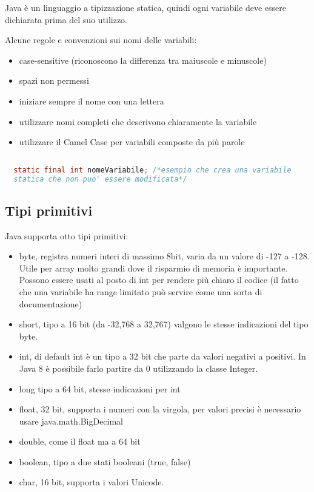 \documentclass[a4paper,12pt,twoside]{book}
\begin{document}
\vspace{1em}

Java è un linguaggio a tipizzazione statica, quindi ogni variabile
deve essere dichiarata prima del suo utilizzo.

Alcune regole e convenzioni sui nomi delle variabili:
\begin{itemize}
\item case-sensitive (riconoscono la differenza
  tra maiuscole e minuscole)
\item spazi non permessi
\item iniziare sempre il nome con una lettera
\item utilizzare nomi completi che descrivono
  chiaramente la variabile
\item utilizzare il Camel Case per variabili composte da più parole
\end{itemize}

\begin{lstlisting}[caption={Dichiarazione variabili},
  label={lst:Declaration},language=Java]
  
  static final int nomeVariabile; /*esempio che crea una variabile
  statica che non puo' essere modificata*/

\end{lstlisting}

\subsection{Tipi primitivi}

Java supporta otto tipi primitivi:
\begin{itemize}
\item byte, registra numeri interi di massimo 8bit, varia da un valore
  di -127 a -128. Utile per array molto grandi dove il risparmio di
  memoria è importante. Possono essere usati al posto di int per
  rendere più chiaro il codice (il fatto che una variabile ha range
  limitato può servire come una sorta di documentazione)
\item short, tipo a 16 bit (da -32,768 a 32,767) valgono le stesse
  indicazioni del tipo byte.
\item int, di default int è un tipo a 32 bit che parte da valori
  negativi a positivi. In Java 8 è possibile farlo partire da 0
  utilizzando la classe Integer.
\item long tipo a 64 bit, stesse indicazioni per int
\item float, 32 bit, supporta i numeri con la virgola, per valori
  precisi è necessario usare java.math.BigDecimal
\item  double, come il float ma a 64 bit
\item boolean, tipo a due stati booleani (true, false)
\item char, 16 bit, supporta i valori Unicode. 
\end{itemize}
\end{document}
